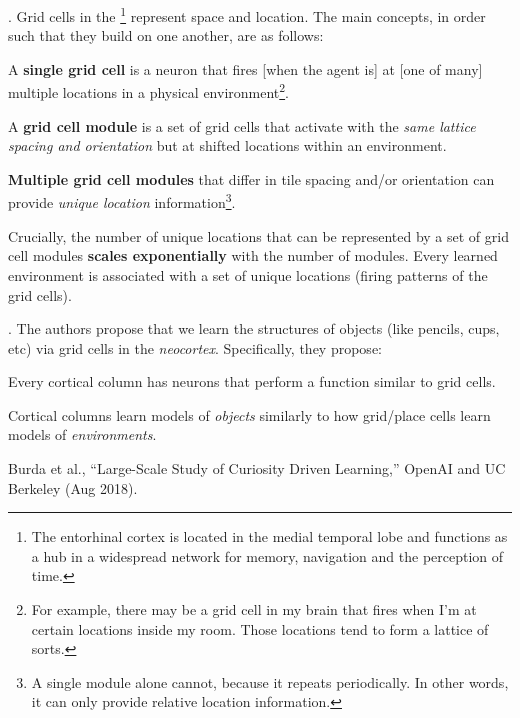 \documentclass[11pt]{article}
\newcommand\myspace[1][]{\vspace{#1\bigskipamount}}
\newcommand\p{\Needspace{10\baselineskip} \noindent}
\begin{document}
\myspace
\p {}. Grid cells in the \footnote{The entorhinal cortex is located in the medial temporal lobe and functions as a hub in a widespread network for memory, navigation and the perception of time.} represent space and location. The main concepts, in order such that they build on one another, are as follows:
\begin{compactitem}
	\item A \textbf{single grid cell} is a neuron that fires [when the agent is] at [one of many] multiple locations in a physical environment\footnote{For example, there may be a grid cell in my brain that fires when I'm at certain locations inside my room. Those locations tend to form a lattice of sorts.}.
	
	\item A \textbf{grid cell module} is a set of grid cells that activate with the \textit{same lattice spacing and orientation} but at shifted locations within an environment. 
	
	\item \textbf{Multiple grid cell modules} that differ in tile spacing and/or orientation can provide \textit{unique location} information\footnote{A single module alone cannot, because it repeats periodically. In other words, it can only provide relative location information.}.
\end{compactitem}
Crucially, the number of unique locations that can be represented by a set of grid cell modules \textbf{scales exponentially} with the number of modules. Every learned environment is associated with a set of unique locations (firing patterns of the grid cells).

\myspace{}
\p {}. The authors propose that we learn the structures of objects (like pencils, cups, etc) via grid cells in the \textit{neocortex}. Specifically, they propose:
\begin{compactenum}
	\item Every cortical column has neurons that perform a function similar to grid cells.
	
	\item Cortical columns learn models of \textit{objects} similarly to how grid/place cells learn models of \textit{environments}.
\end{compactenum}



\vspace{-1em}
{\footnotesize Burda et al., ``Large-Scale Study of Curiosity Driven Learning,'' OpenAI and UC Berkeley (Aug 2018).}
\end{document}
